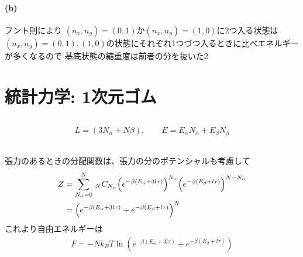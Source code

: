 \documentclass[../../master.tex]{subfiles}
\begin{document}
\subsubsection{(b)}
フント則により
\((n_x,n_y)=(0,1)\)か\((n_x,n_y)=(1,0)\)に2つ入る状態は
\((n_x,n_y)=(0,1),(1,0)\)の状態にそれぞれ1つづつ入るときに比べエネルギーが多くなるので
基底状態の縮重度は前者の分を抜いた2

\chapter{統計力学: 1次元ゴム}
\section{}
\begin{align}
    L=(3N_\alpha+N\beta),\qquad E = E_\alpha N_\alpha+ E_\beta N_\beta
\end{align}
\section{}
張力のあるときの分配関数は、張力の分のポテンシャルも考慮して
\begin{align}
    Z
    &= \sum_{N_\alpha=0}^{N} \,_NC_{N_\alpha} \qty(e^{-\beta(E_\alpha+3l\tau)})^{N_\alpha}\qty(e^{-\beta(E_\beta+l\tau)})^{N-N_\alpha}\\
    &= \qty(e^{-\beta(E_\alpha+3l\tau)}+e^{-\beta(E_\beta+l\tau)})^N
\end{align}
これより自由エネルギーは
\begin{align}
    F = -Nk_B T \ln(e^{-\beta(E_\alpha+3l\tau)}+e^{-\beta(E_\beta+l\tau)})
\end{align}
\end{document}
